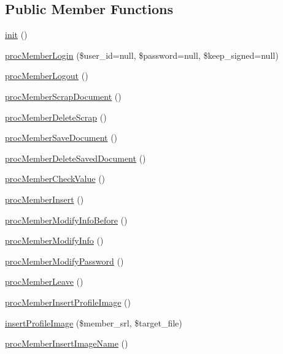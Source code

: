 \subsection*{Public Member Functions}
\begin{DoxyCompactItemize}
\item 
\hyperlink{classmemberController_a1de8a45f3b986e23bbf60d685f8d779d}{init} ()
\item 
\hyperlink{classmemberController_a1e37a85198193c84a66b4472a677960d}{proc\+Member\+Login} (\$user\+\_\+id=null, \$password=null, \$keep\+\_\+signed=null)
\item 
\hyperlink{classmemberController_a9b27cafc18ca21df327c49842987c829}{proc\+Member\+Logout} ()
\item 
\hyperlink{classmemberController_a7c582f99e2bda6a956a7a2a33a01c6c6}{proc\+Member\+Scrap\+Document} ()
\item 
\hyperlink{classmemberController_ae1eb0a3ef4da18d06c4fce0dc4fbbe24}{proc\+Member\+Delete\+Scrap} ()
\item 
\hyperlink{classmemberController_abe77500da26f14cd629ca373f94e04d1}{proc\+Member\+Save\+Document} ()
\item 
\hyperlink{classmemberController_a4e154a138901b9b941f9949576c47f00}{proc\+Member\+Delete\+Saved\+Document} ()
\item 
\hyperlink{classmemberController_ac9e9ed09b49a295c94a4c3bad239757f}{proc\+Member\+Check\+Value} ()
\item 
\hyperlink{classmemberController_a8f176054f72833b01e2229108da0b599}{proc\+Member\+Insert} ()
\item 
\hyperlink{classmemberController_ac7a79ff38569abb383495b4d796eba69}{proc\+Member\+Modify\+Info\+Before} ()
\item 
\hyperlink{classmemberController_abe0dc1c6680e07a0189e53a10a7651f2}{proc\+Member\+Modify\+Info} ()
\item 
\hyperlink{classmemberController_ae62edfe1a880c94c02fba4c04b22add3}{proc\+Member\+Modify\+Password} ()
\item 
\hyperlink{classmemberController_a4c78a9114c62d27178d70bb4b8d19455}{proc\+Member\+Leave} ()
\item 
\hyperlink{classmemberController_ac8b43955581e87f21c77ee741f633a66}{proc\+Member\+Insert\+Profile\+Image} ()
\item 
\hyperlink{classmemberController_af7334a64b7530387a5f761935d042933}{insert\+Profile\+Image} (\$member\+\_\+srl, \$target\+\_\+file)
\item 
\hyperlink{classmemberController_a5477f3466e28c09d13f182406893a3d6}{proc\+Member\+Insert\+Image\+Name} ()

\end{DoxyCompactItemize}
